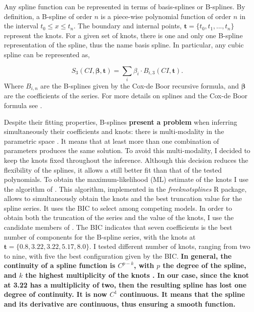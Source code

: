 Any spline function can be represented in terms of basis-splines or B-splines. By definition, a B-spline of order $n$ is a piece-wise polynomial function of order $n$ in the interval $t_0 \leq x \leq t_n$. The boundary and internal points, $\mathbf{t}=\{t_0,t_1,...,t_n\}$ represent the knots. For a given set of knots, there is one and only one B-spline representation of the spline, thus the name basis spline.  In particular, any cubic spline can be represented as,

\begin{equation}
S_3(CI,\boldsymbol{\beta},\mathbf{t}) = \sum_i \beta_i\cdot B_{i,3}(CI,\mathbf{t}).
\end{equation}
Where $B_{i,n}$ are the B-splines given by the Cox-de Boor recursive formula, and $\boldsymbol{\beta}$ are the coefficients of the series. For more details on splines and the Cox-de Boor formula see \citet{deBoor1978}.

Despite their fitting properties, B-splines \textbf{present a problem} when inferring simultaneously their coefficients and knots: there is multi-modality in the parametric space \citep{Lindstrom1999}. It means that at least more than one combination of parameters produces the same solution. To avoid this multi-modality, I decided to keep the knots fixed throughout the inference. Although this decision reduces the flexibility of the splines, it allows a still better fit than that of the tested polynomials. To obtain the maximum-likelihood (ML) estimate of the knots I use the algorithm of  \citet{Spiriti2013}. This algorithm, implemented in the \emph{freeknotsplines} R package, allows to simultaneously obtain the knots and the best truncation value for the spline series. It uses the BIC to select among competing models. In order to obtain both the truncation of the series and the value of the knots, I use the candidate members of \citet{Bouy2015}. The BIC indicates that seven coefficients is the best number of components for the B-spline series, with the knots at $\mathbf{t}=\{0.8,3.22,3.22,5.17,8.0\}$. I tested different number of knots, ranging from two to nine, with five the best configuration given by the BIC. \textbf{In general, the continuity of a spline function is $C^{p-k}$, with $p$ the degree of the spline, and $k$ the highest multiplicity of the knots \citep{deBoor1978}. In our case, since the knot at 3.22 has a multiplicity of two, then the resulting spline has lost one degree of continuity. It is now $C^1$ continuous. It means that the spline and its derivative are continuous, thus ensuring a smooth function.}

